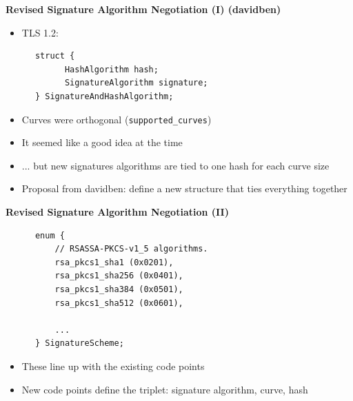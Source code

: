 \documentclass[helvetica]{seminar}
\newcommand{\heading}[1]{%
  \begin{center} 
    \large\bf 
    #1 
  \end{center} 
  \vspace{.4 in}}
\begin{document}
\begin{slide}
\heading{Revised Signature Algorithm Negotiation (I) (davidben)}

\begin{itemize}
\item TLS 1.2:
\end{itemize}

{\scriptsize
\begin{verbatim}
      struct {
            HashAlgorithm hash;
            SignatureAlgorithm signature;
      } SignatureAndHashAlgorithm;
\end{verbatim}
}

\begin{itemize}
\item Curves were orthogonal (\verb^supported_curves^)
\item It seemed like a good idea at the time
\item ... but new signatures algorithms are tied to one hash for each curve size
\item Proposal from davidben: define a new structure that ties everything together
\end{itemize}
\end{slide}

\begin{slide}
\heading{Revised Signature Algorithm Negotiation (II)}

{\scriptsize
\begin{verbatim}
      enum {
          // RSASSA-PKCS-v1_5 algorithms.
          rsa_pkcs1_sha1 (0x0201),
          rsa_pkcs1_sha256 (0x0401),
          rsa_pkcs1_sha384 (0x0501),
          rsa_pkcs1_sha512 (0x0601),

          ...
      } SignatureScheme;
\end{verbatim}
}

\begin{itemize}
\item These line up with the existing code points
\item New code points define the triplet: signature algorithm, curve, hash
\end{itemize}
\end{slide}
\end{document}
